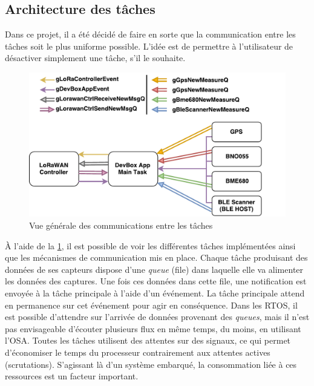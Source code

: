 \FloatBarrier
\subsection{Architecture des tâches}
\label{sec-smartcanton_tasks_overview}

Dans ce projet, il a été décidé de faire en sorte que la communication entre les tâches soit le plus uniforme possible. L'idée est de permettre à l'utilisateur de désactiver simplement une tâche, s'il le souhaite. 

\begin{figure}[ht!]
    \centering
    \includegraphics[width=1.0\textwidth]{Figures/Software/smartcanton_tasks_overview.pdf}
    \caption{Vue générale des communications entre les tâches}
    \label{fig-smartcanton_tasks_overview}
\end{figure}

À l'aide de la \cref{fig-smartcanton_tasks_overview}, il est possible de voir les différentes tâches implémentées ainsi que les mécanismes de communication mis en place. Chaque tâche produisant des données de ses capteurs dispose d'une \textit{queue} (file) dans laquelle elle va alimenter les données des captures. Une fois ces données dans cette file, une notification est envoyée à la tâche principale à l'aide d'un événement. La tâche principale attend en permanence sur cet événement pour agir en conséquence. Dans les RTOS, il est possible d'attendre sur l'arrivée de données provenant des \textit{queues}, mais il n'est pas envisageable d'écouter plusieurs flux en même temps, du moins, en utilisant l'OSA. 
Toutes les tâches utilisent des attentes sur des signaux, ce qui permet d'économiser le temps du processeur contrairement aux attentes actives (scrutations). S'agissant là d'un système embarqué, la consommation liée à ces ressources est un facteur important.


